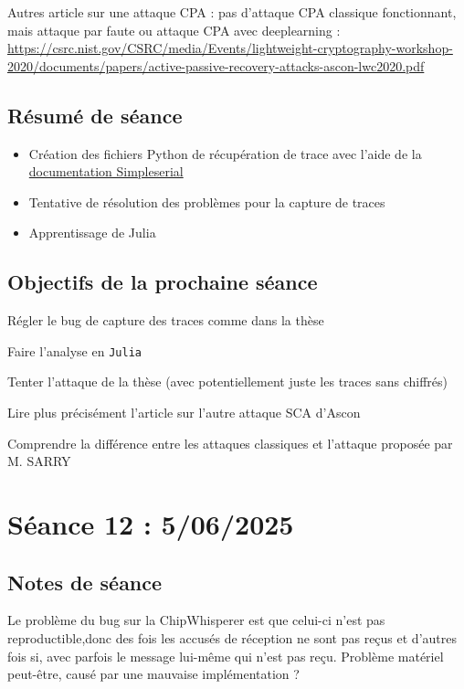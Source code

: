 \documentclass[12pt]{article}
\newcommand{\cmark}{\ding{51}}%
\newcommand{\xmark}{\ding{55}}%
\newcommand{\done}{\rlap{$\square$}{\raisebox{2pt}{\large\hspace{1pt}\cmark}}%
	\hspace{-2.5pt}}
\newcommand{\wontfix}{\rlap{$\square$}{\large\hspace{1pt}\xmark}}
\begin{document}
	\noindent Autres article sur une attaque CPA : pas d'attaque CPA classique fonctionnant, mais attaque par faute ou attaque CPA avec deeplearning : \url{https://csrc.nist.gov/CSRC/media/Events/lightweight-cryptography-workshop-2020/documents/papers/active-passive-recovery-attacks-ascon-lwc2020.pdf}
	\subsection{Résumé de séance}
	\begin{itemize}
		\item Création des fichiers Python de récupération de trace avec l'aide de la \href{https://chipwhisperer.readthedocs.io/en/latest/simpleserial.html}{documentation Simpleserial}
		\item Tentative de résolution des problèmes pour la capture de traces
		\item Apprentissage de Julia
	\end{itemize}
	
	\subsection{Objectifs de la prochaine séance}
	\begin{todolist}
		\item[\done] Régler le bug de capture des traces comme dans la thèse
		\item[\done] Faire l'analyse en \verb|Julia|
		\item[\wontfix] Tenter l'attaque de la thèse (avec potentiellement juste les traces sans chiffrés)
		\item[\done] Lire plus précisément l'article sur l'autre attaque SCA d'Ascon
		\item[\done] Comprendre la différence entre les attaques classiques et l'attaque proposée par M. SARRY
	\end{todolist}
	
	
	\section{Séance 12 : 5/06/2025}
	\subsection{Notes de séance}
	Le problème du bug sur la ChipWhisperer est que celui-ci n'est pas reproductible,donc des fois les accusés de réception ne sont pas reçus et d'autres fois si, avec parfois le message lui-même qui n'est pas reçu. Problème matériel peut-être, causé par une mauvaise implémentation ?
	
\end{document}
